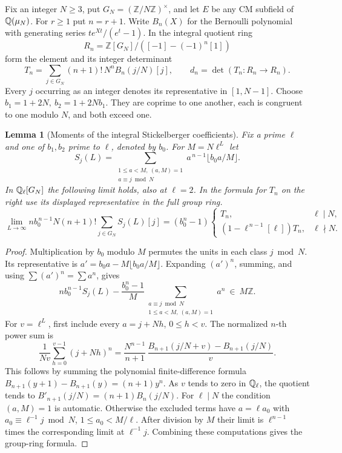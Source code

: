 \documentclass[a4paper,11pt]{article}
\newtheorem{lemma}[proposition]{Lemma}
\theoremstyle{definition}
\theoremstyle{remark}
\newcommand{\ZZ}{\mathbb Z}\newcommand{\ord}{\operatorname{ord}}
\numberwithin{equation}{section}
\begin{document}
Fix an integer \(N\ge3\), put \(G_N=(\ZZ/N\ZZ)^\times\), and
let \(E\) be any CM subfield of \(\mathbb Q(\mu_N)\). For \(r\ge1\)
put \(n=r+1\). Write \(B_n(X)\) for the Bernoulli polynomial
with generating series \(te^{Xt}/(e^t-1)\). In the integral
quotient ring
\[
  R_n=\ZZ[G_N]/([-1]-(-1)^n[1])
\]
form the element and its integer determinant
\[
 T_n=\sum_{j\in G_N}(n+1)!\,N^n B_n(j/N)[j],\qquad
 d_n=\det(T_n:R_n\longrightarrow R_n).
\]
Every \(j\) occurring as an integer denotes its representative
in \([1,N-1]\). Choose \(b_1=1+2N,\ b_2=1+2Nb_1\). They are
coprime to one another, each is congruent to one modulo \(N\),
and both exceed one.

\begin{lemma}[Moments of the integral Stickelberger coefficients]
\leavevmode\label{lem:stickmoments676}
Fix a prime \(\ell\) and one of \(b_1,b_2\) prime to \(\ell\),
denoted by \(b_0\). For \(M=N\ell^L\) let
\[
 S_j(L)=
 \sum_{\substack{1\le a<M,\ (a,M)=1\\a\equiv j\bmod N}}
             a^{\,n-1}\lfloor b_0a/M\rfloor .
\]
In \(\mathbb Q_\ell[G_N]\) the following limit holds, also at
\(\ell=2\). In the formula for \(T_n\) on the right use its
displayed representative in the full group ring.
\[
 \lim_{L\to\infty} n b_0^{\,n-1}N(n+1)!
           \sum_{j\in G_N}S_j(L)[j]
     =(b_0^n-1)
     \begin{cases}
       T_n,&\ell\mid N,\\
       (1-\ell^{\,n-1}[\ell])T_n,&\ell\nmid N .
     \end{cases}
\]
\end{lemma}
\begin{proof}
Multiplication by \(b_0\) modulo \(M\) permutes the units in
each class \(j\bmod N\). Its representative is
\(a'=b_0a-M\lfloor b_0a/M\rfloor\). Expanding \((a')^n\),
summing, and using \(\sum (a')^n=\sum a^n\), gives
\[
 n b_0^{n-1} S_j(L)
   -\frac{b_0^n-1}{M}\sum_{\substack{a\equiv j\bmod N\\
                       1\le a<M,\ (a,M)=1}}a^n
                   \ \in\ M\ZZ .
\]
For \(v=\ell^L\), first include every \(a=j+Nh\), \(0\le h<v\).
The normalized \(n\)-th power sum is
\[
 \frac1{Nv}\sum_{h=0}^{v-1}(j+Nh)^n
   =\frac{N^{n-1}}{n+1}\,
       \frac{B_{n+1}(j/N+v)-B_{n+1}(j/N)}{v}.
\]
This follows by summing the polynomial finite-difference formula
\(B_{n+1}(y+1)-B_{n+1}(y)=(n+1)y^n\).
As \(v\) tends to zero in \(\mathbb Q_\ell\), the quotient tends to
\(B'_{n+1}(j/N)=(n+1)B_n(j/N)\).
For \(\ell\mid N\) the condition \((a,M)=1\) is automatic.
Otherwise the excluded terms have \(a=\ell a_0\) with
\(a_0\equiv\ell^{-1}j\bmod N\), \(1\le a_0<M/\ell\).
After division by \(M\) their limit is \(\ell^{n-1}\) times
the corresponding limit at \(\ell^{-1}j\). Combining these
computations gives the group-ring formula.
\end{proof}
\end{document}
